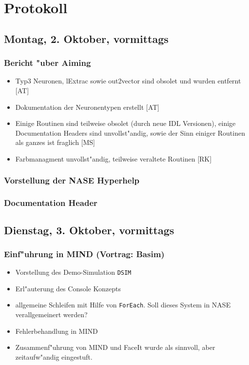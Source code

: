 \documentclass[12pt]{article}
\begin{document}
\section{Protokoll}

\subsection{Montag, 2. Oktober, vormittags}

\subsubsection{Bericht "uber Aiming}
\begin{itemize}
\item Typ3 Neuronen, lExtrac sowie out2vector sind obsolet und wurden entfernt [AT]
\item Dokumentation der Neuronentypen erstellt [AT]
\item Einige Routinen sind teilweise obsolet (durch neue IDL Versionen), einige Documentation Headers sind unvollst"andig, sowie der Sinn einiger Routinen als ganzes ist fraglich [MS]
\item Farbmanagment unvollst"andig, teilweise veraltete Routinen [RK]
\end{itemize}

\subsubsection{Vorstellung der NASE Hyperhelp}

\subsubsection{Documentation Header}




\subsection{Dienstag, 3. Oktober, vormittags}

\subsubsection{Einf"uhrung in MIND (Vortrag: Basim)}
\begin{itemize}
\item Vorstellung des Demo-Simulation \texttt{DSIM}
\item Erl"auterung des Console Konzepts
\item allgemeine Schleifen mit Hilfe von \texttt{ForEach}. Soll dieses System in NASE verallgemeinert werden?
\item Fehlerbehandlung in MIND
\item Zusammenf"uhrung  von MIND und FaceIt wurde als sinnvoll, aber zeitaufw"andig eingestuft.
\end{itemize}
\end{document}
